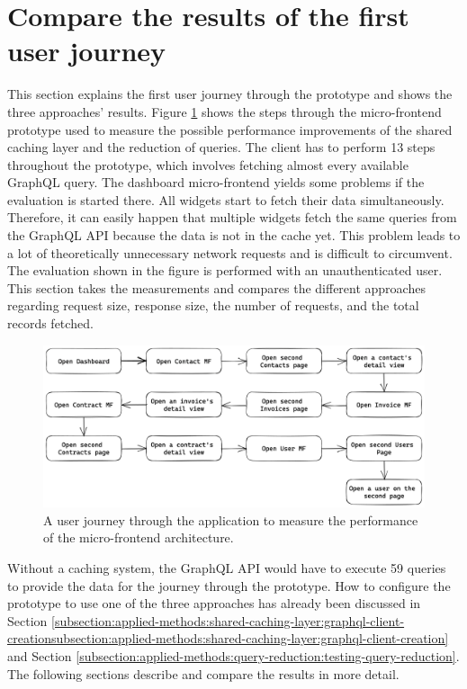 \section{Compare the results of the first user journey}\label{section:results:comparison-first-journey}

This section explains the first user journey through the prototype and shows the three approaches' results. Figure \ref{fig:results:evaluation-first-path} shows the steps through the micro-frontend prototype used to measure the possible performance improvements of the shared caching layer and the reduction of queries. The client has to perform 13 steps throughout the prototype, which involves fetching almost every available GraphQL query. The dashboard micro-frontend yields some problems if the evaluation is started there. All widgets start to fetch their data simultaneously. Therefore, it can easily happen that multiple widgets fetch the same queries from the GraphQL \ac{API} because the data is not in the cache yet. This problem leads to a lot of theoretically unnecessary network requests and is difficult to circumvent. The evaluation shown in the figure is performed with an unauthenticated user. This section takes the measurements and compares the different approaches regarding request size, response size, the number of requests, and the total records fetched.

\ifshowImages
\begin{figure}[H]
  \centering
  \includegraphics[width=1\linewidth]{images/results/evaluation-first-path.png}
  \caption{A user journey through the application to measure the performance of the micro-frontend architecture.}\label{fig:results:evaluation-first-path}
\end{figure}
\fi

\noindent Without a caching system, the GraphQL \ac{API} would have to execute 59 queries to provide the data for the journey through the prototype. How to configure the prototype to use one of the three approaches has already been discussed in Section \ref{subsection:applied-methods:shared-caching-layer:graphql-client-creationsubsection:applied-methods:shared-caching-layer:graphql-client-creation} and Section \ref{subsection:applied-methods:query-reduction:testing-query-reduction}. The following sections describe and compare the results in more detail.


